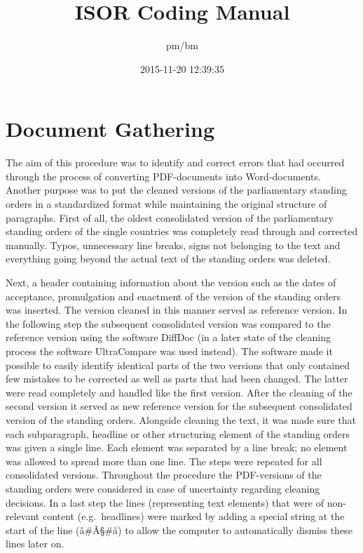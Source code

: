 \documentclass[]{article}
\title{ISOR Coding Manual}
\author{pm/bm}
\date{2015-11-20 12:39:35}
\begin{document}
\maketitle

\section{Document Gathering}\label{document-gathering}

The aim of this procedure was to identify and correct errors that had
occurred through the process of converting PDF-documents into
Word-documents. Another purpose was to put the cleaned versions of the
parliamentary standing orders in a standardized format while maintaining
the original structure of paragraphs. First of all, the oldest
consolidated version of the parliamentary standing orders of the single
countries was completely read through and corrected manually. Typos,
unnecessary line breaks, signs not belonging to the text and everything
going beyond the actual text of the standing orders was deleted.

Next, a header containing information about the version such as the
dates of acceptance, promulgation and enactment of the version of the
standing orders was inserted. The version cleaned in this manner served
as reference version. In the following step the subsequent consolidated
version was compared to the reference version using the software DiffDoc
(in a later state of the cleaning process the software UltraCompare was
used instead). The software made it possible to easily identify
identical parts of the two versions that only contained few mistakes to
be corrected as well as parts that had been changed. The latter were
read completely and handled like the first version. After the cleaning
of the second version it served as new reference version for the
subsequent consolidated version of the standing orders. Alongside
cleaning the text, it was made sure that each subparagraph, headline or
other structuring element of the standing orders was given a single
line. Each element was separated by a line break; no element was allowed
to spread more than one line. The steps were repeated for all
consolidated versions. Throughout the procedure the PDF-versions of the
standing orders were considered in case of uncertainty regarding
cleaning decisions. In a last step the lines (representing text
elements) that were of non-relevant content (e.g.~headlines) were marked
by adding a special string at the start of the line (â\#Â§\#â) to allow
the computer to automatically dismiss these lines later on.
\end{document}
